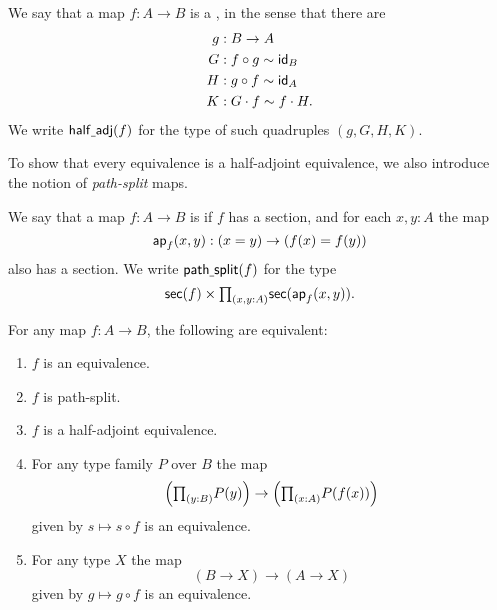 \begin{defn}
We say that a map $f:A\to B$ is a , in the sense that there are
\begin{align*}
g & : B \to A\\
G & : f\circ g \htpy \idfunc[B] \\
H & : g\circ f \htpy \idfunc[A] \\
K & : G\cdot f \htpy f\cdot H.
\end{align*}
We write $\mathsf{half\usc{}adj}(f)$ for the type of such quadruples $(g,G,H,K)$.
\end{defn}

To show that every equivalence is a half-adjoint equivalence, we also introduce the notion of \emph{path-split} maps.

\begin{defn}
We say that a map $f:A\to B$ is  if $f$ has a section, and for each $x,y:A$ the map
\begin{equation*}
\apfunc{f}(x,y):(x=y)\to (f(x)=f(y))
\end{equation*}
also has a section. We write $\mathsf{path\usc{}split}(f)$ for the type
\begin{equation*}
\mathsf{sec}(f)\times\prd{x,y:A}\mathsf{sec}(\apfunc{f}(x,y)).
\end{equation*}
\end{defn}

\begin{thm}\label{ex:equiv_precomp}
For any map $f:A\to B$, the following are equivalent:
\begin{enumerate}
\item $f$ is an equivalence.
\item $f$ is path-split.
\item $f$ is a half-adjoint equivalence.
\item For any type family $P$ over $B$ the map
\begin{equation*}
\Big(\prd{y:B}P(y)\Big)\to\Big(\prd{x:A}P(f(x))\Big)
\end{equation*}
given by $s\mapsto s\circ f$ is an equivalence.
\item For any type $X$ the map
\begin{equation*}
(B\to X)\to (A\to X)
\end{equation*}
given by $g\mapsto g\circ f$ is an equivalence. 
\end{enumerate}
\end{thm}

